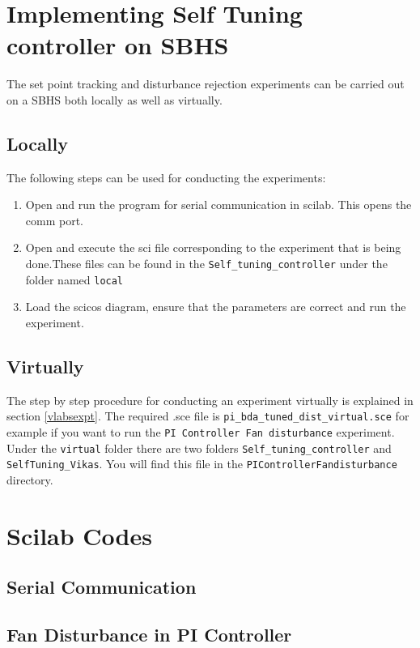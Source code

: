 \section{Implementing Self Tuning controller on SBHS}
The set point tracking and disturbance rejection experiments can be carried out on a SBHS both locally as well as virtually.
\subsection{Locally}
The following steps can be used for conducting the experiments:
\begin{enumerate}
	\item Open and run the program for serial communication in scilab. This opens the comm port.
	\item Open and execute the sci file corresponding to the experiment that is being done.These files can be found in the {\tt Self\_tuning\_controller} under the folder named {\tt local}
	\item Load the scicos diagram, ensure that the parameters are correct and run the experiment.
\end{enumerate}


\subsection{Virtually}
The step by step procedure for conducting an experiment virtually is explained in section \ref{vlabsexpt}. The required .sce file is {\tt pi\_bda\_tuned\_dist\_virtual.sce} for example if you want to run the {\tt PI Controller Fan disturbance} experiment.  Under the {\tt virtual} folder there are two folders {\tt Self\_tuning\_controller} and {\tt SelfTuning\_Vikas}. You will find this file in the {\tt PIControllerFandisturbance} directory. 
\section{Scilab Codes}
\subsection{Serial Communication}
\begin{code}

\end{code}


\subsection{Fan Disturbance in PI Controller}
\begin{code}

\end{code}


